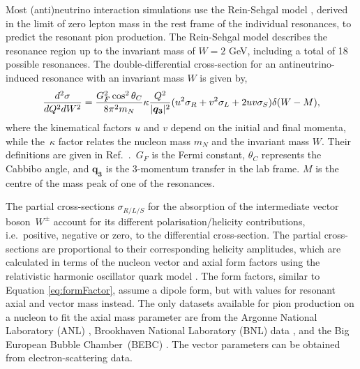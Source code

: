 Most (anti)neutrino interaction simulations use the Rein-Sehgal model \cite{REIN198179}, derived in the limit of zero lepton mass in the rest frame of the individual resonances, to predict the resonant pion production. The Rein-Sehgal model describes the resonance region up to the invariant mass of $W = 2$ GeV, including a total of 18 possible resonances. The double-differential cross-section for an antineutrino-induced resonance with an invariant mass $W$ is given by,
\vspace{-10pt}
\begin{equation}
    \frac{d^2\sigma}{d Q^2 dW^2} = \frac{G_F^2 \cos^2{\theta_{C}}}{8\pi^2 m_N} \kappa \frac{Q^2}{|\bm{q_3}|^2} (u^2\sigma_R + v^2 \sigma_L + 2uv\sigma_S )\delta(W-M) \vspace{2pt},
    \vspace{-10pt}
    \label{eq:rein-sehgal}
\end{equation}
where the kinematical factors $u$ and $v$ depend on the initial and final momenta, while the~$\kappa$ factor relates the nucleon mass $m_N$ and the invariant mass $W$. Their definitions are given in Ref.~\cite{REIN198179}.~$G_F$ is the Fermi constant, $\theta_C$ represents the Cabbibo angle, and $\bm{q_3}$ is the 3-momentum transfer in the lab frame. $M$ is the centre of the mass peak of one of the resonances.

The partial cross-sections $\sigma_{R/L/S}$ for the absorption of the intermediate vector boson~$W^{\pm}$ account for its different polarisation/helicity contributions, i.e.~positive, negative or zero, to the differential cross-section. The partial cross-sections are proportional to their corresponding helicity amplitudes, which are calculated in terms of the nucleon vector and axial form factors using the relativistic harmonic oscillator quark model \cite{PhysRevD.3.2706}. The form factors, similar to Equation \ref{eq:formFactor}, assume a dipole form, but with values for resonant axial and vector mass instead. The only datasets available for pion production on a nucleon to fit the axial mass parameter are from the Argonne National Laboratory (ANL) \cite{ANL_PhysRevD.25.1161}, Brookhaven National Laboratory (BNL) data \cite{BNL_PhysRevD.34.2554}, and the Big European Bubble Chamber~(BEBC) \cite{Allasia:1990uy}. The vector parameters can be obtained from electron-scattering data. 

